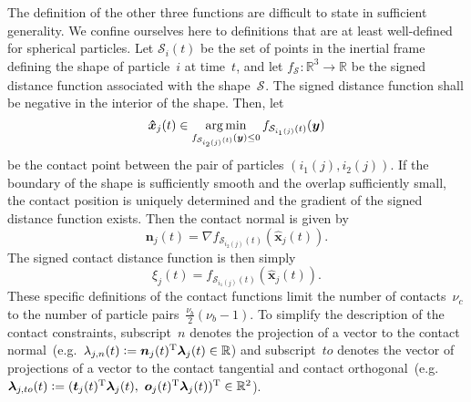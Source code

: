 \documentclass[global,twocolumn]{svjour}
\let\vec\bm
\newcommand{\argmin}{\operatornamewithlimits{arg\,min}}
\newcommand{\vectoscalar}[1]{{\renewcommand{\vec}{}#1}}
\newcommand{\R}{\mathbb{R}}
\newcommand{\transp}{{\mathrm{T}}}
\newcommand{\contactforce}[1]{\ensuremath{\vec{\lambda}_{#1}}}
\newcommand{\contactforceCFn}[1]{\ensuremath{\vectoscalar{\contactforce{\ifstrequal{#1}{}{n}{#1,n}}}}}
\newcommand{\contactforceCFto}[1]{\ensuremath{\contactforce{\ifstrequal{#1}{}{to}{#1,to}}}}
\newcommand{\contactpos}    [1]{\ensuremath{\vec{\hat{x}}_{#1}}}
\newcommand{\numbodies}{\ensuremath{\nu_b}}
\newcommand{\numcontacts}{\ensuremath{\nu_c}}
\newcommand{\shape}    [1]{\ensuremath{\mathcal{S}_{#1}}}
\begin{document}
		The definition of the other three functions are difficult to state in
		sufficient generality. We confine ourselves here to
		definitions that are at least well-defined for spherical particles.
		Let $\shape{i}(t)$ be the set of points in the inertial frame
		defining the shape of particle~$i$ at time~$t$, and let
		$f_{\shape{}}: \R^3 \rightarrow \R$ be the signed distance function associated
		with the shape~\shape{}. The signed distance function shall be negative in the
		interior of the shape. Then, let
		\begin{equation*}
			\contactpos{j}(t) \in \argmin_{f_{\shape{i_2(j)}(t)}(\vec y) \leq 0} f_{\shape{i_1(j)}(t)}(\vec y)
		\end{equation*}
		be the contact point between the pair of particles $(i_1(j),\allowbreak i_2(j))$.
		If the boundary of the shape is sufficiently smooth and the overlap
		sufficiently small, the contact position is uniquely determined and the
		gradient of the signed distance function exists. Then the contact normal
		is given by
		\begin{equation*}
			\vec n_j(t) = \nabla f_{\shape{i_2(j)}(t)}(\contactpos{j}(t)).
		\end{equation*}
		The signed contact distance function is then simply
		\begin{equation*}
			\xi_j(t) = f_{\shape{i_1(j)}(t)}(\contactpos{j}(t)).
		\end{equation*}
		These specific definitions of the contact functions limit the number of contacts~\numcontacts{}
		to the number of particle pairs~$\frac{\numbodies}{2}(\numbodies - 1)$.
		To simplify the description of the contact constraints,
		subscript~$n$ denotes the projection of a vector to the contact
		normal~(e.g.\ $\contactforceCFn{j}(t) := \vec n_j(t)^\transp \contactforce{j}(t) \in \R$)
		and subscript~$to$ denotes the vector of projections of a vector to
		the contact tangential and contact
		orthogonal~(e.g.\ $\contactforceCFto{j}(t) := (\vec t_j(t)^\transp \contactforce{j}(t),\ \vec o_j(t)^\transp \contactforce{j}(t))^\transp \in \R^2$).
\end{document}
